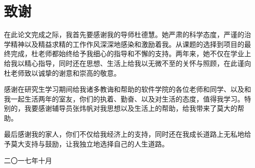 {\kaishu
{\chapter*{\vspace{-3cm} 致\qquad 谢}}

\vspace{-0.5cm}

\begin{center} 
\end{center}
	
	在此论文完成之际，我首先要感谢我的导师杜德慧。她严肃的科学态度，严谨的治学精神以及精益求精的工作作风深深地感染和激励着我。从课题的选择到项目的最终完成，杜老师都始终给予我细心的指导和不懈的支持。两年来，她不仅在学业上给我以精心指导，同时还在思想、生活上给我以无微不至的关怀与照顾，在此谨向杜老师致以诚挚的谢意和崇高的敬意。

	感谢在研究生学习期间给我诸多教诲和帮助的软件学院的各位老师和同学、以及和我一起生活两年的室友，你们的执着、勤奋、以及对生活的态度，值得我学习。特别的，我要感谢辅导员张炜帆对我思想以及生活上的帮助，给我带来了莫大的帮助。

	最后感谢我的家人，你们不仅给我经济上的支持，同时还在我成长道路上无私地给予莫大支持与鼓励，让我独立地选择自己的人生道路。

\vspace{0.2cm} \hspace{11.5cm} 

\hspace{10.6cm}  二〇一七年十月 }
